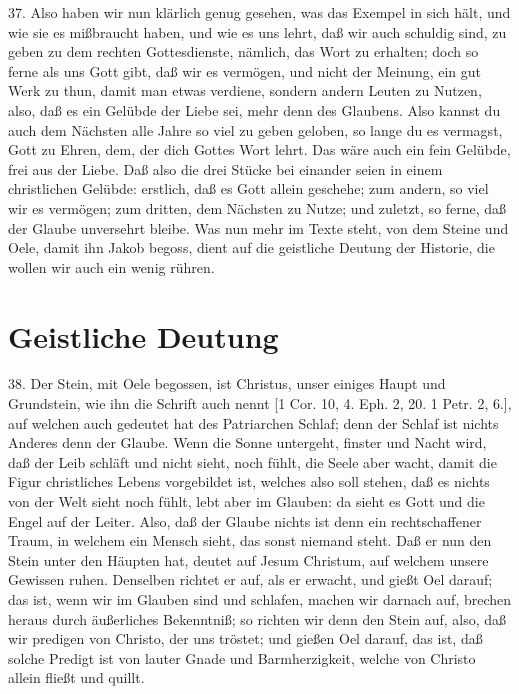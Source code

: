 37. Also haben wir nun klärlich genug gesehen, was das Exempel in sich hält, und wie sie es mißbraucht haben, und wie es uns lehrt, daß wir auch schuldig sind, zu geben zu dem rechten Gottesdienste, nämlich, das Wort zu erhalten; doch so ferne als uns Gott gibt, daß wir es vermögen, und nicht der Meinung, ein gut Werk zu thun, damit man etwas verdiene, sondern andern Leuten zu Nutzen, also, daß es ein Gelübde der Liebe sei, mehr denn des Glaubens. Also kannst du auch dem Nächsten alle Jahre so viel zu geben geloben, so lange du es vermagst, Gott zu Ehren, dem, der dich Gottes Wort lehrt. Das wäre auch ein fein Gelübde, frei aus der Liebe. Daß also die drei Stücke bei einander seien in einem christlichen Gelübde: erstlich, daß es Gott allein geschehe; zum andern, so viel wir es vermögen; zum dritten, dem Nächsten zu Nutze; und zuletzt, so ferne, daß der Glaube unversehrt bleibe. Was nun mehr im Texte steht, von dem Steine und Oele, damit ihn Jakob begoss, dient auf die geistliche Deutung der Historie, die wollen wir auch ein wenig rühren.

\section{Geistliche Deutung}
38. Der Stein, mit Oele begossen, ist Christus, unser einiges Haupt und Grundstein, wie ihn die Schrift auch nennt [1 Cor. 10, 4. Eph. 2, 20. 1 Petr. 2, 6.], auf welchen auch gedeutet hat des Patriarchen Schlaf; denn der Schlaf ist nichts Anderes denn der Glaube. Wenn die Sonne untergeht, finster und Nacht wird, daß der Leib schläft und nicht sieht, noch fühlt, die Seele aber wacht, damit die Figur christliches Lebens vorgebildet ist, welches also soll stehen, daß es nichts von der Welt sieht noch fühlt, lebt aber im Glauben: da sieht es Gott und die Engel auf der Leiter. Also, daß der Glaube nichts ist denn ein rechtschaffener Traum, in welchem ein Mensch sieht, das sonst niemand
steht. Daß er nun den Stein unter den Häupten hat, deutet auf Jesum Christum, auf welchem unsere Gewissen ruhen. Denselben richtet er auf, als er erwacht, und gießt Oel darauf; das ist, wenn wir im Glauben sind und schlafen, machen wir darnach auf, brechen heraus durch äußerliches Bekenntniß; so richten wir denn den Stein auf, also, daß wir predigen von Christo, der uns tröstet; und gießen Oel darauf, das ist, daß solche Predigt ist von lauter Gnade und Barmherzigkeit, welche von Christo allein fließt und quillt.

